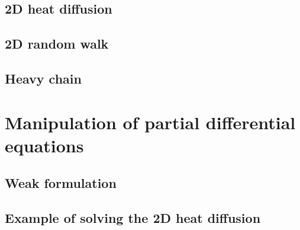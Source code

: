 \subsection{2D heat diffusion}


\subsection{2D random walk}


\subsection{Heavy chain}


\section{Manipulation of partial differential equations}

\subsection{Weak formulation}


\subsection{}

\subsection{}

\subsection{Example of solving the 2D heat diffusion}
